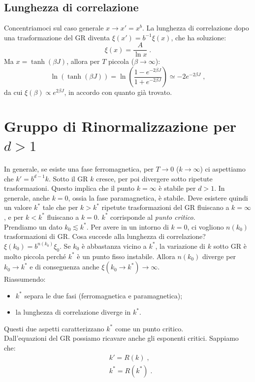 \documentclass[10pt,a4paper]{report}
\theoremstyle{definition}
\numberwithin{equation}{section}
\begin{document}
\subsection{Lunghezza di correlazione}
Concentriamoci sul caso generale $x\to x'=x^b$. La lunghezza di correlazione dopo una trasformazione del GR diventa $\xi(x')=b^{-1}\xi(x)$, che ha soluzione:
\begin{equation}
\xi(x)=\frac{A}{\ln x}\;.
\end{equation}
Ma $x=\tanh(\beta J)$, allora per $T$ piccola ($\beta\to\infty$):
$$
\ln(\tanh(\beta J))=\ln\left(\frac{1-e^{-2\beta J}}{1+e^{-2\beta J}}\right)\simeq -2e^{-2\beta J}\;,
$$
da cui $\xi(\beta)\propto e^{2\beta J}$, in accordo con quanto già trovato.
\section{Gruppo di Rinormalizzazione per $d>1$}
In generale, se esiste una fase ferromagnetica, per $T\to 0$ ($k\to\infty$) ci aspettiamo che $k'=b^{d-1}k$. Sotto il GR $k$ cresce, per poi divergere sotto ripetute trasformazioni. Questo implica che il punto $k=\infty$ è stabile per $d>1$. In generale, anche $k=0$, ossia la fase paramagnetica, è stabile. Deve esistere quindi un valore $k^*$ tale che per $k>k^*$ ripetute trasformazioni del GR fluiscano a $k=\infty$, e per $k<k^*$ fluiscano a $k=0$. $k^*$ corrisponde al \emph{punto critico}. \\
Prendiamo un dato $k_0\lesssim k^*$. Per avere in un intorno di $k=0$, ci vogliono $n(k_0)$ trasformazioni di GR. Cosa succede alla lunghezza di correlazione? $\xi(k_0)=b^{n(k_0)}\xi_0$. Se $k_0$ è abbastanza vicino a $k^*$, la variazione di $k$ sotto GR è molto piccola perché $k^*$ è un punto fisso instabile. Allora $n(k_0)$ diverge per $k_0\to k^*$ e di conseguenza anche $\xi(k_0\to k^*)\to \infty$. \\
Riassumendo:
\begin{itemize}
\item $k^*$ separa le due fasi (ferromagnetica e paramagnetica);
\item la lunghezza di correlazione diverge in $k^*$.
\end{itemize}
Questi due aspetti caratterizzano $k^*$ come un punto critico. \\
Dall'equazioni del GR possiamo ricavare anche gli esponenti critici. Sappiamo che:
\begin{align*}
&k'=R(k)\;, \\
&k^*=R(k^*)\;.
\end{align*}
\end{document}

